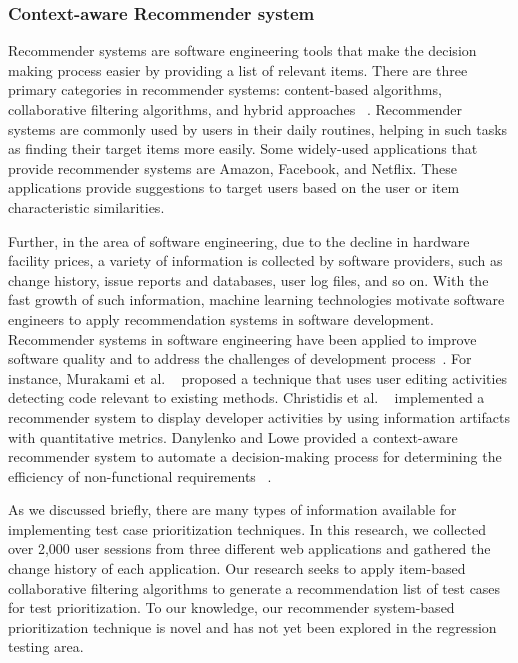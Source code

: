 \subsubsection*{Context-aware Recommender system}
Recommender systems are software engineering tools that make 
the decision making process easier by providing a list of relevant items.
There are three primary  categories in recommender systems:
content-based algorithms, collaborative filtering algorithms, and hybrid approaches ~\cite{recomsurvey05}.  
Recommender systems are commonly used by users in their daily routines, 
helping in such tasks as finding 
their target items more easily.
Some widely-used applications that provide recommender systems
are Amazon, Facebook, and Netflix. These applications provide suggestions
to target users based on the user or item characteristic similarities.  

Further, in the area of software engineering, due to the decline in hardware 
facility prices, a variety of information is collected by software 
providers, such as change history, issue reports and databases, user log files, 
and so on.
With the fast growth of such information, machine learning technologies  
motivate software engineers to apply recommendation systems in software 
development. Recommender systems in software engineering have been applied  
to improve software quality and to address the challenges of development process~\cite{rssebook}.  
For instance, Murakami et al. ~\cite{murakami} proposed a technique that 
uses user editing activities  detecting code relevant to existing methods. 
Christidis et al. ~\cite{costas} implemented a recommender system 
to display developer activities by using information artifacts with quantitative metrics. 
Danylenko and Lowe provided a context-aware recommender system 
to automate a decision-making process for determining the efficiency of 
non-functional requirements ~\cite{contextawar}.

As we discussed briefly, there are many types of information available 
for implementing test case prioritization techniques.
In this research, we collected over 2,000 user sessions from 
three different web applications and gathered the change history of each application. 
Our research seeks to apply item-based collaborative filtering algorithms 
to generate a recommendation list of test cases for 
test prioritization.
To our knowledge, our recommender system-based prioritization technique is novel 
and has not yet been explored in the regression testing area.








